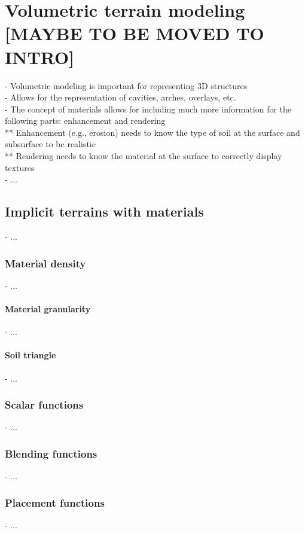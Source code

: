 \chapter{Volumetric terrain modeling [MAYBE TO BE MOVED TO INTRO]}
\label{chap:volumic-modeling}
\minitoc

- Volumetric modeling is important for representing 3D structures \\
- Allows for the representation of cavities, arches, overlays, etc. \\
- The concept of materials allows for including much more information for the following parts: enhancement and rendering \\
** Enhancement (e.g., erosion) needs to know the type of soil at the surface and subsurface to be realistic \\
** Rendering needs to know the material at the surface to correctly display textures \\
- ...

\section{Implicit terrains with materials}
\label{sec:volumic-modeling_implicit-terrain-with-materials}
- ...

\subsection{Material density}
- ...

\subsubsection{Material granularity}
- ...

\subsubsection{Soil triangle}
- ...

\subsection{Scalar functions}
- ...

\subsection{Blending functions}
- ...

\subsection{Placement functions}
- ...

